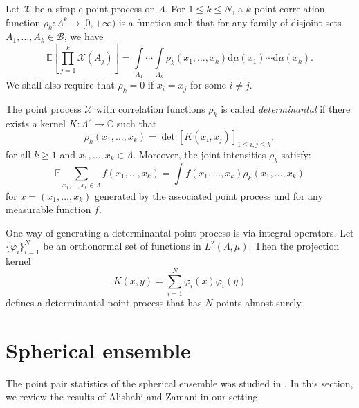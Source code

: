 \documentclass[a4paper,11pt]{amsart}
\begin{document}
Let $\mathcal{X}$ be a simple point process on $\Lambda$. For $1\leq k\leq N$, a $k$-point correlation function $\rho_k\colon \Lambda^k\rightarrow [0,+\infty)$ is a function such that for any family of disjoint sets $A_1,\dots , A_k\in\mathcal{B}$, we have 
$$\mathbb{E}\left[\prod\limits_{j=1}^k \mathcal{X}(A_j) \right]=\int\limits_{A_1}\cdots \int\limits_{A_k}\rho_k(x_1,\dots,x_k)\mathrm{d}\mu(x_1)\cdots \mathrm{d}\mu(x_k).$$
We shall also require that $\rho_k=0$ if $x_i=x_j$ for some $i\neq j$. 

The point process $\mathcal{X}$ with correlation functions $\rho_k$ is called \textit{determinantal} if there exists a kernel $K\colon \Lambda^2\rightarrow \mathbb{C}$ such that
$$\rho_k(x_1,\dots,x_k)=\det\left[K(x_i,x_j)\right]_{1\leq i,j\leq k},$$
for all $k\geq 1$ and $x_1,\dots , x_k\in \Lambda$. Moreover, the joint intensities $\rho_k$ satisfy:
$$\mathbb{E} \sum\limits_{x_1,\dots,x_k\in\Lambda}f(x_1,\dots,x_k)=\int f(x_1,\dots,x_k)\rho_k(x_1,\dots,x_k)$$
for $x = (x_1, \dots , x_k)$  generated by the associated point process and for any measurable function $f$.

One way of generating a determinantal point process is via integral operators. Let $\{\varphi_i\}_{i=1}^N$ be an orthonormal set of functions in $L^2(\Lambda,\mu)$. Then the projection kernel 
$$K(x,y)=\sum\limits_{i=1}^N  \varphi_i(x)\overline{\varphi_i(y)}$$
defines a determinantal point process that has $N$ points almost surely. 






\section{Spherical ensemble}

The point pair statistics of the spherical ensemble was studied in \cite{Alishahi2015}. In this section, we review the results of Alishahi and Zamani in our setting.
\end{document}

